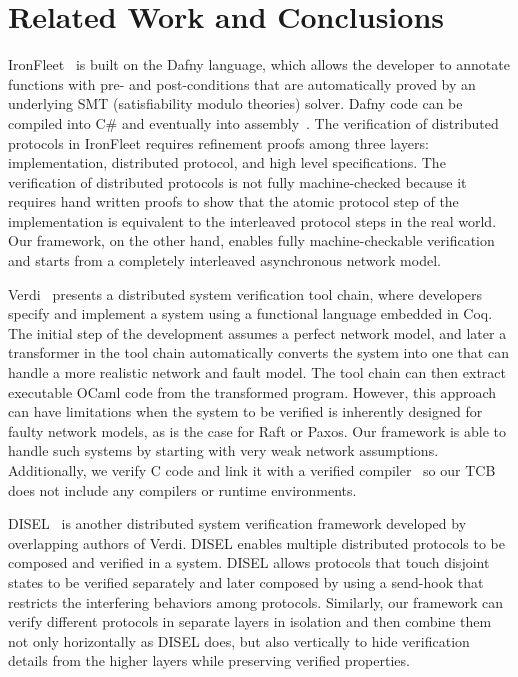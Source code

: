 \section{Related Work and Conclusions}
\label{sec:related}

 IronFleet~\cite{ironfleet} is built on the Dafny language, 
which allows the developer to annotate functions with pre- and post-conditions that are automatically proved 
by an underlying SMT (satisfiability modulo theories) solver.
Dafny code can be compiled into C\# and eventually into assembly~\cite{ironclad}. 
The verification of distributed protocols in IronFleet requires refinement proofs among three layers: 
implementation, distributed protocol, and high level specifications.
The verification of distributed protocols is not fully machine-checked because
it requires hand written proofs to show that the atomic protocol step of the implementation
is equivalent to the interleaved protocol steps in the real world.
Our framework, on the other hand, enables fully machine-checkable verification and starts from a completely interleaved asynchronous network model.

Verdi~\cite{verdi} presents a distributed system verification tool chain, 
where developers specify and implement a system using a functional language embedded in Coq.
The initial step of the development assumes a perfect network model, and later a transformer
in the tool chain automatically converts the system into one that can handle a more realistic network and fault model.
The tool chain can then extract executable OCaml code from the transformed program.
However, this approach can have limitations when the system to be verified is inherently designed for faulty network models, as is the case for Raft or Paxos.
Our framework is able to handle such systems by starting with very weak network assumptions.
Additionally, we verify C code and link it with a verified compiler~\cite{compcert} so our TCB does not include any compilers or runtime environments.

DISEL~\cite{disel} is another distributed system verification framework developed 
by overlapping authors of Verdi. DISEL enables multiple distributed protocols 
to be composed and verified in a system. 
DISEL allows protocols that touch disjoint states to be verified
separately and later composed by using a send-hook
that restricts the interfering behaviors among protocols. 
Similarly, our framework can verify different protocols in separate layers in isolation and then combine them not only horizontally as DISEL does,
but also vertically to hide verification details from the higher layers while preserving verified properties.

